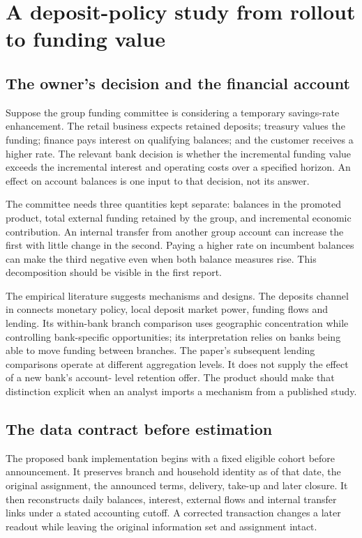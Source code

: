 \chapter{A deposit-policy study from rollout to funding value}\label{ch:deposits}
\section{The owner's decision and the financial account}
Suppose the group funding committee is considering a temporary savings-rate
enhancement. The retail business expects retained deposits; treasury values
the funding; finance pays interest on qualifying balances; and the customer
receives a higher rate. The relevant bank decision is whether the incremental
funding value exceeds the incremental interest and operating costs over a
specified horizon. An effect on account balances is one input to that
decision, not its answer.

The committee needs three quantities kept separate: balances in the promoted
product, total external funding retained by the group, and incremental
economic contribution. An internal transfer from another group account can
increase the first with little change in the second. Paying a higher rate
on incumbent balances can make the third negative even when both balance
measures rise. This decomposition should be visible in the first report.

The empirical literature suggests mechanisms and designs. The deposits
channel in \citet{drechsler2017} connects monetary policy, local deposit
market power, funding flows and lending. Its within-bank branch comparison
uses geographic concentration while controlling bank-specific opportunities;
its interpretation relies on banks being able to move funding between
branches. The paper's subsequent lending comparisons operate at different
aggregation levels. It does not supply the effect of a new bank's account-
level retention offer. The product should make that distinction explicit
when an analyst imports a mechanism from a published study.

\section{The data contract before estimation}
The proposed bank implementation begins with a fixed eligible cohort before
announcement. It preserves branch and household identity as of that date,
the original assignment, the announced terms, delivery, take-up and later
closure. It then reconstructs daily balances, interest, external flows and
internal transfer links under a stated accounting cutoff. A corrected
transaction changes a later readout while leaving the original information
set and assignment intact.

